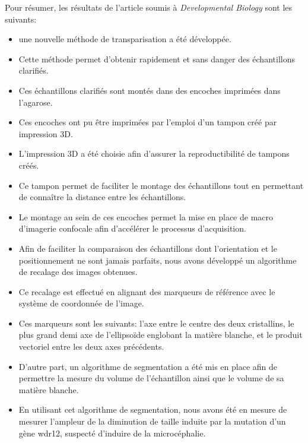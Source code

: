 \documentclass[\main/main.tex]{subfiles}
\begin{document}
%
Pour résumer, les résultats de l'article soumis à \emph{Developmental Biology} sont les suivants: 
\begin{itemize}
    \item 
    une nouvelle méthode de transparisation a été développée.
    
    \item
    Cette méthode permet d'obtenir rapidement et sans danger des échantillons clarifiés.
    
    \item
    Ces échantillons clarifiés sont montés dans des encoches imprimées dans l'agarose.
    
    \item
    Ces encoches ont pu être imprimées par l'emploi d'un tampon créé par impression 3D.
    
    \item
    L'impression 3D a été choisie afin d'assurer la reproductibilité de tampons créés.
    
    \item 
    Ce tampon permet de faciliter le montage des échantillons tout en permettant de connaître
    la distance entre les échantillons.
    
    \item
    Le montage au sein de ces encoches permet la mise en place de macro d'imagerie confocale afin d'accélérer le processus d'acquisition.
    
    \item
    Afin de faciliter la comparaison des échantillons dont l'orientation et le positionnement ne sont jamais parfaits, nous avons développé un algorithme de recalage des images obtenues.
    
    \item
    Ce recalage est effectué en alignant des marqueurs de référence avec le système de coordonnée de l'image.
    
    \item
    Ces marqueurs sont les suivants: l'axe entre le centre des deux cristallins, le plus grand demi axe de l'ellipsoïde englobant la matière blanche, et le produit vectoriel entre les deux axes précédents.
    
    \item
    D'autre part, un algorithme de segmentation a été mis en place afin de permettre la mesure du volume de l'échantillon ainsi que le volume de sa matière blanche.
    
    \item
    En utilisant cet algorithme de segmentation, nous avons été en mesure de mesurer
    l'ampleur de la diminution de taille induite par la mutation d'un gène wdr12, suspecté d'induire de la microcéphalie.
    

\end{itemize}
\end{document}
